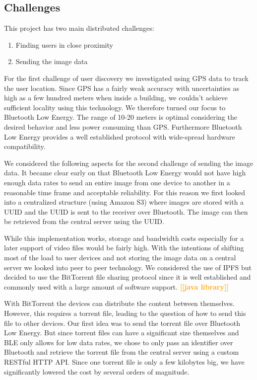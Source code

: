 \documentclass{report}
\newcommand{\todo}[1]{\textsf{\textbf{\textcolor{orange}{[[#1]]}}}}
\begin{document}
\subsection{Challenges}
This project has two main distributed challenges:
\begin{enumerate} 
    \item Finding users in close proximity
    \item Sending the image data
\end{enumerate}

For the first challenge of user discovery we investigated using GPS data to track the user location. Since GPS has a fairly weak accuracy with uncertainties as high as a few hundred meters when inside a building, we couldn't achieve sufficient locality using this technology. We therefore turned our focus to Bluetooth Low Energy. The range of 10-20 meters is optimal considering the desired behavior and less power consuming than GPS. Furthermore Bluetooth Low Energy provides a well established protocol with wide-spread hardware compatibility.

We considered the following aspects for the second challenge of sending the image data.
It became clear early on that Bluetooth Low Energy would not have high enough data rates to send an entire image from one device to another in a reasonable time frame and acceptable reliability. For this reason we first looked into a centralized structure (using Amazon S3) where images are stored with a UUID and the UUID is sent to the receiver over Bluetooth. The image can then be retrieved from the central server using the UUID.

While this implementation works, storage and bandwidth costs especially for a later support of video files would be fairly high. With the intentions of shifting most of the load to user devices and not storing the image data on a central server we looked into peer to peer technology. We considered the use of IPFS but decided to use the BitTorrent file sharing protocol since it is well established and commonly used with a large amount of software support. \todo{java library} 

With BitTorrent the devices can distribute the content between themselves. However, this requires a torrent file, leading to the question of how to send this file to other devices. Our first idea was to send the torrent file over Bluetooth Low Energy. But since torrent files can have a significant size themselves and BLE only allows for low data rates, we chose to only pass an identifier over Bluetooth and retrieve the torrent file from the central server  using a custom RESTful HTTP API. Since one torrent file is only a few kilobytes big, we have significantly lowered the cost by several orders of magnitude.
\end{document}
